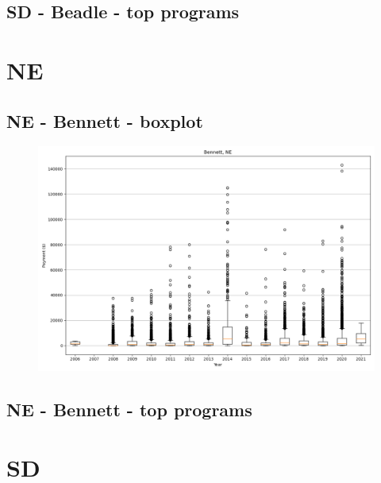 \subsection*{SD - Beadle - top programs}

\newpage
\section*{NE}
\subsection*{NE - Bennett - boxplot}
\begin{figure}[h]
\centering
\includegraphics[width=7in]{../output/boxplots/counties/Bennett-NE_boxplot.png}
\end{figure}


\subsection*{NE - Bennett - top programs}

\newpage
\section*{SD}
